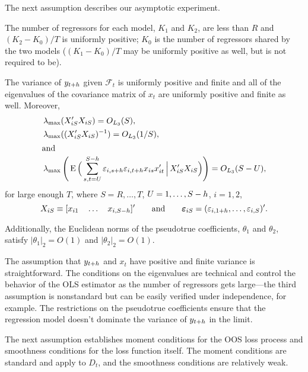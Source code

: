 \documentclass[12pt]{article}
\begin{document}
The next assumption describes our asymptotic experiment.
\begin{asmp}\label{asmp-2}
  The number of regressors for each model, $K_1$ and $K_2$, are less
  than $R$ and $(K_2-K_0)/T$ is uniformly positive;
  $K_0$ is the number of regressors shared by the two models ($(K_1 - K_0)/T$
  may be uniformly positive as well, but is not required to be).

  The variance of $y_{t+h}$ given $\mathcal{F}_t$ is uniformly
  positive and finite and all of the eigenvalues of the covariance
  matrix of $x_t$ are uniformly positive and finite as well.
  Moreover,
  \begin{align*}
    &\eigen_{\max}(X_{iS}'X_{iS}) = O_{L_3}(S), \\
    &\eigen_{\max}((X_{iS}'X_{iS})^{-1}) = O_{L_3}(1/S), \\
    \intertext{and}%
    &\eigen_{\max}\Bigg(\E\Big( \sum_{s,t=U}^{S-h} \e_{i,s+\h} \e_{i,t+\h} x_{is}x_{it}'
    \,\Big|\, X_{iS}'X_{iS} \Big)\Bigg) = O_{L_3}(S-U),
  \end{align*}
  for large enough $T$, where $S = R,\dots,T$, $U=1,\dots,S-h$,
  $i = 1,2$,
  \[ X_{iS} \equiv [x_{i1} \quad \dots \quad x_{i,S-h}]' \qquad
  \text{and} \qquad \boldsymbol{\varepsilon}_{iS} = (\varepsilon_{i,1+h}, \dots, \varepsilon_{i,S})'.\]

  Additionally, the Euclidean norms of the pseudotrue coefficients,
  $\theta_1$ and $\theta_2$, satisfy $|\theta_1|_2 = O(1)$ and
  $|\theta_2|_2 = O(1)$.
\end{asmp}

The assumption that $y_{t+h}$ and $x_t$ have positive and finite
variance is straightforward. The conditions on the eigenvalues are
technical and control the behavior of the OLS estimator as the number
of regressors gets large---the third assumption is nonstandard but can
be easily verified under independence, for example. The restrictions
on the pseudotrue coefficients ensure that the regression model
doesn't dominate the variance of $y_{t+h}$ in the limit.

The next assumption establishes moment conditions for the OOS loss
process and smoothness conditions for the loss function itself. The
moment conditions are standard and apply to $D_t$, and the smoothness
conditions are relatively weak.
\end{document}
